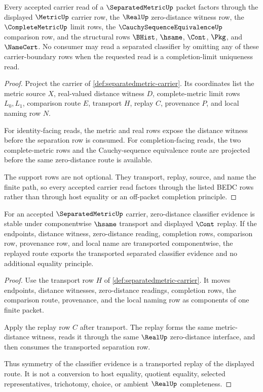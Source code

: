 \begin{theorem}
\label{thm:separatedmetric-carrier-boundary}
Every accepted carrier read of a $\SeparatedMetricUp$ packet factors through the displayed $\MetricUp$ carrier row, the $\RealUp$ zero-distance witness row, the $\CompleteMetricUp$ limit rows, the $\CauchySequenceEquivalenceUp$ comparison row, and the structural rows $\BHist$, $\hsame$, $\Cont$, $\Pkg$, and $\NameCert$. No consumer may read a separated classifier by omitting any of these carrier-boundary rows when the requested read is a completion-limit uniqueness read.
\end{theorem}
\begin{proof}
Project the carrier of \autoref{def:separatedmetric-carrier}. Its coordinates list the metric source $X$, real-valued distance witness $D$, complete-metric limit rows $L_0,L_1$, comparison route $E$, transport $H$, replay $C$, provenance $P$, and local naming row $N$.

For identity-facing reads, the metric and real rows expose the distance witness before the separation row is consumed. For completion-facing reads, the two complete-metric rows and the Cauchy-sequence equivalence route are projected before the same zero-distance route is available.

The support rows are not optional. They transport, replay, source, and name the finite path, so every accepted carrier read factors through the listed BEDC rows rather than through host equality or an off-packet completion principle.
\end{proof}

\begin{theorem}
\label{thm:separatedmetric-symmetry-transport}
For an accepted $\SeparatedMetricUp$ carrier, zero-distance classifier evidence is stable under componentwise $\hsame$ transport and displayed $\Cont$ replay. If the endpoints, distance witness, zero-distance reading, completion rows, comparison row, provenance row, and local name are transported componentwise, the replayed route exports the transported separated classifier evidence and no additional equality principle.
\end{theorem}
\begin{proof}
Use the transport row $H$ of \autoref{def:separatedmetric-carrier}. It moves endpoints, distance witnesses, zero-distance readings, completion rows, the comparison route, provenance, and the local naming row as components of one finite packet.

Apply the replay row $C$ after transport. The replay forms the same metric-distance witness, reads it through the same $\RealUp$ zero-distance interface, and then consumes the transported separation row.

Thus symmetry of the classifier evidence is a transported replay of the displayed route. It is not a conversion to host equality, quotient equality, selected representatives, trichotomy, choice, or ambient $\RealUp$ completeness.
\end{proof}

